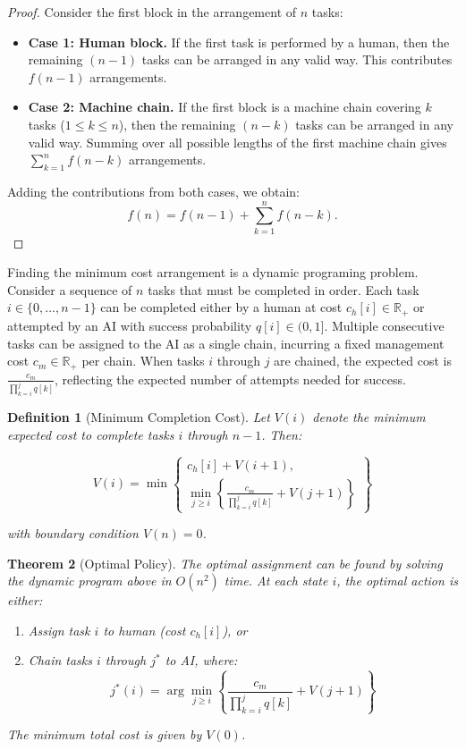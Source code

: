 \documentclass{article}
\theoremstyle{plain}
\theoremstyle{plain}
\newtheorem{theorem}{Theorem}
\newtheorem{definition}[theorem]{Definition}
\begin{document}
  \begin{proof}
  Consider the first block in the arrangement of $n$ tasks:
  \begin{itemize}
      \item \textbf{Case 1: Human block.} If the first task is performed by a human, then the remaining $(n-1)$ tasks can be arranged in any valid way. This contributes $f(n-1)$ arrangements.
      \item \textbf{Case 2: Machine chain.} If the first block is a machine chain covering $k$ tasks ($1 \leq k \leq n$), then the remaining $(n-k)$ tasks can be arranged in any valid way. Summing over all possible lengths of the first machine chain gives $\sum_{k=1}^{n} f(n-k)$ arrangements.
  \end{itemize}
  Adding the contributions from both cases, we obtain:
  \[
  f(n) = f(n-1) + \sum_{k=1}^{n} f(n-k).
  \]
  \end{proof}
 
Finding the minimum cost arrangement is a dynamic programing problem.
Consider a sequence of $n$ tasks that must be completed in order. 
Each task $i \in \{0,\ldots,n-1\}$ can be completed either by a human at cost $c_h[i] \in \mathbb{R}_+$ or attempted by an AI with success probability $q[i] \in (0,1]$.
Multiple consecutive tasks can be assigned to the AI as a single chain, incurring a fixed management cost $c_m \in \mathbb{R}_+$ per chain. 
When tasks $i$ through $j$ are chained, the expected cost is $\frac{c_m}{\prod_{k=i}^j q[k]}$, reflecting the expected number of attempts needed for success.

\begin{definition}[Minimum Completion Cost]
Let $V(i)$ denote the minimum expected cost to complete tasks $i$ through $n-1$. Then:

\begin{equation}
V(i) = \min\left\{
\begin{array}{l}
c_h[i] + V(i+1), \\[1ex]
\displaystyle\min_{j \geq i} \left\{\frac{c_m}{\prod_{k=i}^j q[k]} + V(j+1)\right\}
\end{array}
\right\}
\end{equation}

with boundary condition $V(n) = 0$.
\end{definition}

\begin{theorem}[Optimal Policy]
The optimal assignment can be found by solving the dynamic program above in $O(n^2)$ time. At each state $i$, the optimal action is either:
\begin{enumerate}
    \item Assign task $i$ to human (cost $c_h[i]$), or
    \item Chain tasks $i$ through $j^*$ to AI, where:
    \begin{equation}
        j^*(i) = \arg\min_{j \geq i} \left\{\frac{c_m}{\prod_{k=i}^j q[k]} + V(j+1)\right\}
    \end{equation}
\end{enumerate}
The minimum total cost is given by $V(0)$.
\end{theorem}
\end{document}

